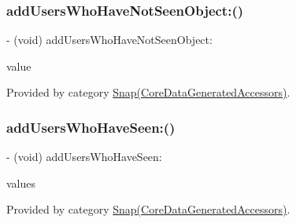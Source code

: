 \hypertarget{interface_snap_a857bdb8ecd8f9e24445e64fd8279a126}{}\label{interface_snap_a857bdb8ecd8f9e24445e64fd8279a126} 
\subsubsection{\texorpdfstring{add\+Users\+Who\+Have\+Not\+Seen\+Object\+:()}{addUsersWhoHaveNotSeenObject:()}}
{\footnotesize\ttfamily -\/ (void) add\+Users\+Who\+Have\+Not\+Seen\+Object\+: \begin{DoxyParamCaption}\item[{(\hyperlink{interface_friend}{Friend} $\ast$)}]{value }\end{DoxyParamCaption}}



Provided by category \hyperlink{category_snap_07_core_data_generated_accessors_08_a857bdb8ecd8f9e24445e64fd8279a126}{Snap(\+Core\+Data\+Generated\+Accessors)}.

\hypertarget{interface_snap_a855a2e43572cd214251230b2a0612421}{}\label{interface_snap_a855a2e43572cd214251230b2a0612421} 
\subsubsection{\texorpdfstring{add\+Users\+Who\+Have\+Seen\+:()}{addUsersWhoHaveSeen:()}}
{\footnotesize\ttfamily -\/ (void) add\+Users\+Who\+Have\+Seen\+: \begin{DoxyParamCaption}\item[{(N\+S\+Set$<$ \hyperlink{interface_friend}{Friend} $\ast$ $>$ $\ast$)}]{values }\end{DoxyParamCaption}}



Provided by category \hyperlink{category_snap_07_core_data_generated_accessors_08_a855a2e43572cd214251230b2a0612421}{Snap(\+Core\+Data\+Generated\+Accessors)}.

\hypertarget{interface_snap_a6841f827b13abc833d3ec7c40c522a1b}{}\label{interface_snap_a6841f827b13abc833d3ec7c40c522a1b} 
